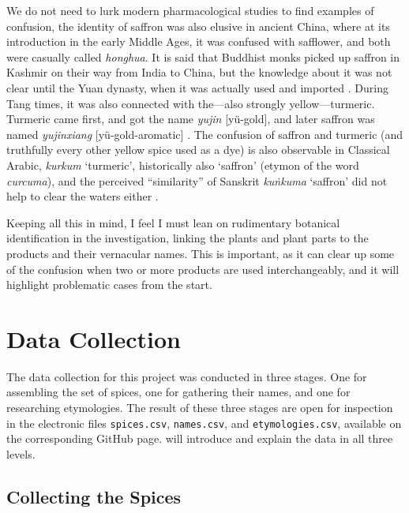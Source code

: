 We do not need to lurk modern pharmacological studies to find examples of confusion, the identity of saffron was also elusive in ancient China, where at its introduction in the early Middle Ages, it was confused with safflower, and both were casually called  \textit{honghua}. It is said that Buddhist monks picked up saffron in Kashmir on their way from India to China, but the knowledge about it was not clear until the Yuan dynasty, when it was actually used and imported \autocite{laufer_sino-iranica_1919}. During Tang times, it was also connected with the---also strongly yellow---turmeric. Turmeric came first, and got the name  \textit{yujin} [yü-gold], and later saffron was named  \textit{yujinxiang} [yü-gold-aromatic] \autocite{schafer_golden_1985}. The confusion of saffron and turmeric (and truthfully every other yellow spice used as a dye) is also observable in Classical Arabic, \textit{kurkum} `turmeric', historically also `saffron' (etymon of the word \textit{curcuma}), and the perceived ``similarity'' of Sanskrit  \textit{kuṅkuma} `saffron' did not help to clear the waters either \autocite[see]{guthrie_trade-language_2009}.

Keeping all this in mind, I feel I must lean on rudimentary botanical identification in the investigation, linking the plants and plant parts to the products and their vernacular names. This is important, as it can clear up some of the confusion when two or more products are used interchangeably, and it will highlight problematic cases from the start.



\section{Data Collection}
\label{sec:data_collection}


The data collection for this project was conducted in three stages. One for assembling the set of spices, one for gathering their names, and one for researching etymologies. The result of these three stages are open for inspection in the electronic files \texttt{spices.csv}, \texttt{names.csv}, and \texttt{etymologies.csv}, available on the corresponding GitHub page.   will introduce and explain the data in all three levels.

\subsection{Collecting the Spices}

